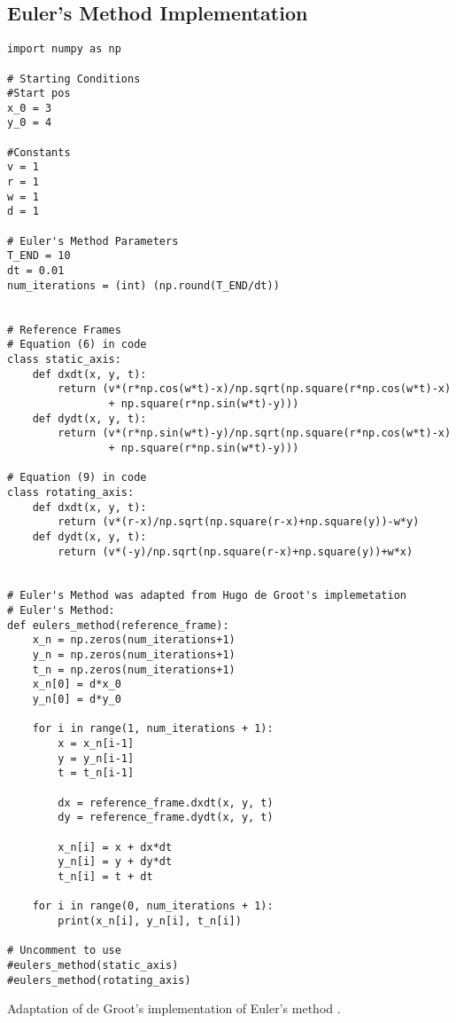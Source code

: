 \documentclass[pstricks, border=12pt]{article}
\begin{document}
\newpage
\begin{appendices}

\section{Euler's Method Implementation}\label{appendix:code}


\begin{lstlisting}
import numpy as np

# Starting Conditions
#Start pos
x_0 = 3
y_0 = 4

#Constants
v = 1
r = 1
w = 1
d = 1

# Euler's Method Parameters
T_END = 10
dt = 0.01
num_iterations = (int) (np.round(T_END/dt))


# Reference Frames
# Equation (6) in code
class static_axis: 
    def dxdt(x, y, t):
        return (v*(r*np.cos(w*t)-x)/np.sqrt(np.square(r*np.cos(w*t)-x) 
                + np.square(r*np.sin(w*t)-y)))
    def dydt(x, y, t):
        return (v*(r*np.sin(w*t)-y)/np.sqrt(np.square(r*np.cos(w*t)-x) 
                + np.square(r*np.sin(w*t)-y)))

# Equation (9) in code
class rotating_axis:
    def dxdt(x, y, t):
        return (v*(r-x)/np.sqrt(np.square(r-x)+np.square(y))-w*y)
    def dydt(x, y, t):
        return (v*(-y)/np.sqrt(np.square(r-x)+np.square(y))+w*x)


# Euler's Method was adapted from Hugo de Groot's implemetation
# Euler's Method:
def eulers_method(reference_frame):
    x_n = np.zeros(num_iterations+1)
    y_n = np.zeros(num_iterations+1)
    t_n = np.zeros(num_iterations+1)
    x_n[0] = d*x_0
    y_n[0] = d*y_0

    for i in range(1, num_iterations + 1):
        x = x_n[i-1]
        y = y_n[i-1]
        t = t_n[i-1]
        
        dx = reference_frame.dxdt(x, y, t)
        dy = reference_frame.dydt(x, y, t)

        x_n[i] = x + dx*dt
        y_n[i] = y + dy*dt
        t_n[i] = t + dt

    for i in range(0, num_iterations + 1):
        print(x_n[i], y_n[i], t_n[i])

# Uncomment to use
#eulers_method(static_axis)
#eulers_method(rotating_axis)
\end{lstlisting}
Adaptation of de Groot's implementation of Euler's method \cite{degroot_2020}.
\end{appendices}
\newpage


\end{document}
